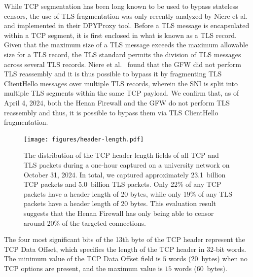 \documentclass[conference,compsoc]{IEEEtran}
\begin{document}
While TCP segmentation has been long known to be used to bypass stateless censors,
the use of TLS fragmentation was only recently analyzed by Niere et al.~\cite{Niere2023a}
and implemented in their DPYProxy tool.
Before a TLS message is encapsulated within a TCP segment,
it is first enclosed in what is known as a TLS record.
Given that the maximum size of a TLS message exceeds the maximum allowable size for a TLS record,
the TLS standard permits the division of TLS messages across several TLS records.
Niere et al.~\cite{Niere2023a} found that the GFW did not perform TLS reassembly
and it is thus possible to bypass it by fragmenting TLS ClientHello messages over multiple TLS records,
wherein the SNI is split into multiple TLS segments within the same TCP payload.
We confirm that,
as of April 4, 2024,
both the Henan Firewall and the GFW do not perform TLS reassembly and thus,
it is possible to bypass them via TLS ClientHello fragmentation.



\begin{figure}[t!]
  \centering
  \texttt{[image: figures/header-length.pdf]}
  \caption{
  The distribution of the TCP header length fields of all TCP and TLS packets
  during a one-hour captured on a university network on October 31, 2024.
  In total,
  we captured approximately 23.1~billion TCP packets and 5.0~billion TLS packets.
  Only 22\% of any TCP packets have a header length of 20 bytes,
  while only 19\% of any TLS packets have a header length of 20 bytes.
  This evaluation result suggests that the Henan Firewall has only being able to
  censor around 20\% of the targeted connections.
  }
  \label{fig:header-length}
\end{figure}


The four most significant bits of the 13th byte of the TCP header represent the TCP Data Offset,
which specifies the length of the TCP header in 32-bit words.
The minimum value of the TCP Data Offset field is $5$ words (20~bytes)
when no TCP options are present,
and the maximum value is $15$ words (60~bytes).
\end{document}
